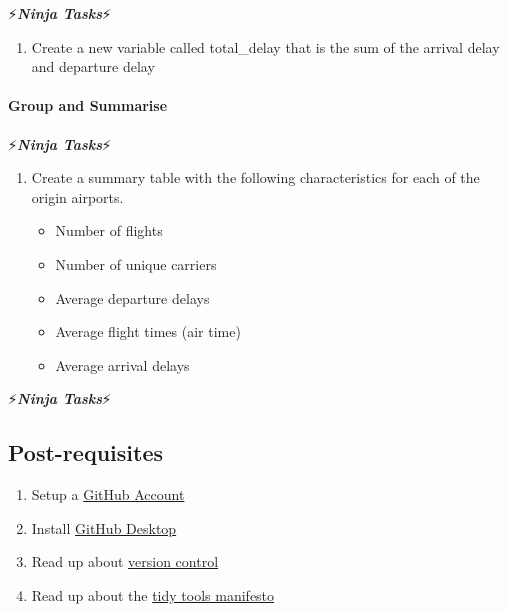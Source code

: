 \documentclass[]{article}
\providecommand{\tightlist}{%
  \setlength{\itemsep}{0pt}\setlength{\parskip}{0pt}}
\let\oldparagraph\paragraph
\renewcommand{\paragraph}[1]{\oldparagraph{#1}\mbox{}}
\begin{document}
⚡\textbf{\emph{Ninja Tasks}}⚡

\begin{enumerate}
\def\labelenumi{\arabic{enumi}.}
\tightlist
\item
  Create a new variable called total\_delay that is the sum of the
  arrival delay and departure delay
\end{enumerate}

\paragraph{Group and Summarise}\label{group-and-summarise}

⚡\textbf{\emph{Ninja Tasks}}⚡

\begin{enumerate}
\def\labelenumi{\arabic{enumi}.}
\tightlist
\item
  Create a summary table with the following characteristics for each of
  the origin airports.

  \begin{itemize}
  \tightlist
  \item
    Number of flights
  \item
    Number of unique carriers
  \item
    Average departure delays
  \item
    Average flight times (air time)
  \item
    Average arrival delays
  \end{itemize}
\end{enumerate}

⚡\textbf{\emph{Ninja Tasks}}⚡

\subsection{Post-requisites}\label{post-requisites}

\begin{enumerate}
\def\labelenumi{\arabic{enumi}.}
\tightlist
\item
  Setup a \href{https://github.com}{GitHub Account}
\item
  Install \href{https://desktop.github.com/}{GitHub Desktop}
\item
  Read up about
  \href{https://www.atlassian.com/git/tutorials/what-is-version-control}{version
  control}
\item
  Read up about the
  \href{https://cran.r-project.org/web/packages/tidyverse/vignettes/manifesto.html}{tidy
  tools manifesto}
\end{enumerate}
\end{document}
